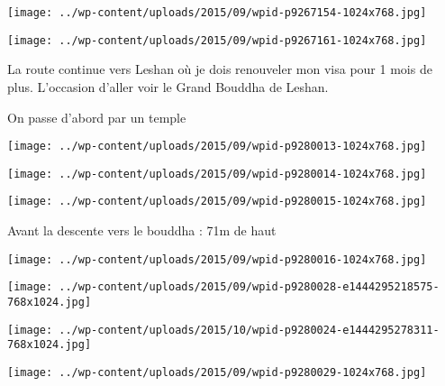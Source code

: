  

\begin{center} \texttt{[image: ../wp-content/uploads/2015/09/wpid-p9267154-1024x768.jpg]} \end{center}

 

 

\begin{center} \texttt{[image: ../wp-content/uploads/2015/09/wpid-p9267161-1024x768.jpg]} \end{center}

 

 La route continue vers Leshan où je dois renouveler mon visa pour 1 mois de plus. L'occasion d'aller voir le Grand Bouddha de Leshan. 

 On passe d'abord par un temple 

 

\begin{center} \texttt{[image: ../wp-content/uploads/2015/09/wpid-p9280013-1024x768.jpg]} \end{center}

 

 

\begin{center} \texttt{[image: ../wp-content/uploads/2015/09/wpid-p9280014-1024x768.jpg]} \end{center}

 

 

\begin{center} \texttt{[image: ../wp-content/uploads/2015/09/wpid-p9280015-1024x768.jpg]} \end{center}

 

 Avant la descente vers le bouddha : 71m de haut 

 

\begin{center} \texttt{[image: ../wp-content/uploads/2015/09/wpid-p9280016-1024x768.jpg]} \end{center}

 

 

\begin{center} \texttt{[image: ../wp-content/uploads/2015/09/wpid-p9280028-e1444295218575-768x1024.jpg]} \end{center}

 

 

\begin{center} \texttt{[image: ../wp-content/uploads/2015/10/wpid-p9280024-e1444295278311-768x1024.jpg]} \end{center}

 

 

\begin{center} \texttt{[image: ../wp-content/uploads/2015/09/wpid-p9280029-1024x768.jpg]} \end{center}




 
 
